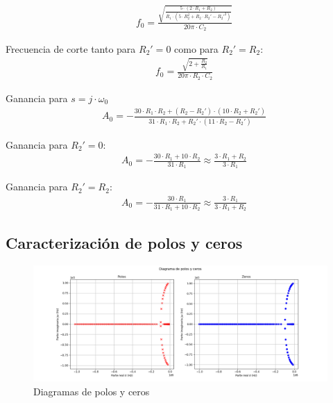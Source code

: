 \begin{align}
    &f_0 = \frac{\sqrt{\frac{5 \cdot \left(2 \cdot R_1 + R_2\right)}{R_1 \cdot \left(5 \cdot R_2^2 + R_2 \cdot R_2' - R_2'^2\right)}}}{20 \pi \cdot C_2}
    \label{eq:ej5_notch_frequency}
\end{align}

Frecuencia de corte tanto para $R_2' = 0$ como para $R_2' = R_2$:
\begin{align}
    &f_0 = \frac{\sqrt{2 + \frac{R_2}{R_1}}}{20 \pi \cdot R_2 \cdot C_2}
    \label{eq:ej5_notch_frequency_limit_cases}
\end{align}

Ganancia para $s = j \cdot \omega_0$
\begin{align}
    &A_0 = - \frac{30 \cdot R_1 \cdot R_2 + \left(R_2 - R_2'\right) \cdot \left(10 \cdot R_2 + R_2'\right)}{31 \cdot R_1 \cdot R_2 + R_2' \cdot \left(11 \cdot R_2 - R_2'\right)}
    \label{eq:ej5_system_gain}
\end{align}

Ganancia para $R_2' = 0$:
\begin{align}
    &A_0 = - \frac{30 \cdot R_1 + 10 \cdot R_2}{31 \cdot R_1} \approx \frac{3 \cdot R_1 + R_2}{3 \cdot R_1}
    \label{eq:ej5_system_gain_for_R2'_0}
\end{align}

Ganancia para $R_2' = R_2$:
\begin{align}
    &A_0 = - \frac{30 \cdot R_1}{31 \cdot R_1 + 10 \cdot R_2} \approx \frac{3 \cdot R_1}{3 \cdot R_1 + R_2}
    \label{eq:ej5_system_gain_for_R2'_R2}
\end{align}



\subsection{Caracterización de polos y ceros}

\begin{figure}[H]
    \centering
    \includegraphics[width=\textwidth]{../EJ5/latex_resources/diagrama_polos_y_ceros}
    \caption{Diagramas de polos y ceros}
    \label{fig:poles_and_zeros_diag_ej5}
\end{figure}

